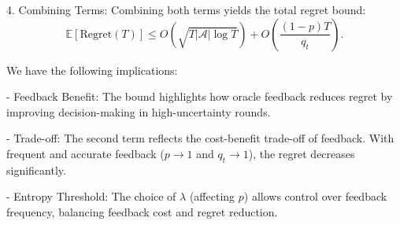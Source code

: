 4. Combining Terms:
   Combining both terms yields the total regret bound:
   \[
   \mathbb{E}[\text{Regret}(T)] \leq O\left(\sqrt{T |\mathcal{A}| \log T}\right) + O\left(\frac{(1 - p) T}{q_t}\right).
   \]


We have the following implications:

- Feedback Benefit: The bound highlights how oracle feedback reduces regret by improving decision-making in high-uncertainty rounds.

- Trade-off: The second term reflects the cost-benefit trade-off of feedback. With frequent and accurate feedback (\(p \to 1\) and \(q_t \to 1\)), the regret decreases significantly.

- Entropy Threshold: The choice of \(\lambda\) (affecting \(p\)) allows control over feedback frequency, balancing feedback cost and regret reduction.